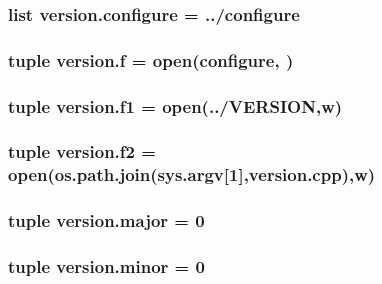 \subsubsection[{configure}]{\setlength{\rightskip}{0pt plus 5cm}list version.\+configure = \textquotesingle{}../configure\textquotesingle{}}\label{namespaceversion_aedc91fd7b4b027899ea1441123d88f96}
\hypertarget{namespaceversion_adc2f36e5bef89e3881981af504e0e31d}{}
\subsubsection[{f}]{\setlength{\rightskip}{0pt plus 5cm}tuple version.\+f = {\bf open}({\bf configure}, \textquotesingle{})}\label{namespaceversion_adc2f36e5bef89e3881981af504e0e31d}
\hypertarget{namespaceversion_ae6011bf923c4ed95d1f1de5740caa956}{}
\subsubsection[{f1}]{\setlength{\rightskip}{0pt plus 5cm}tuple version.\+f1 = {\bf open}(\textquotesingle{}../V\+E\+R\+S\+I\+O\+N\textquotesingle{},\textquotesingle{}w\textquotesingle{})}\label{namespaceversion_ae6011bf923c4ed95d1f1de5740caa956}
\hypertarget{namespaceversion_ab584c69a59e4cd6b0d5ac80b1f445303}{}
\subsubsection[{f2}]{\setlength{\rightskip}{0pt plus 5cm}tuple version.\+f2 = {\bf open}(os.\+path.\+join(sys.\+argv\mbox{[}1\mbox{]},\textquotesingle{}version.\+cpp\textquotesingle{}),\textquotesingle{}w\textquotesingle{})}\label{namespaceversion_ab584c69a59e4cd6b0d5ac80b1f445303}
\hypertarget{namespaceversion_adfa78588540698359a6bd30edafdebd0}{}
\subsubsection[{major}]{\setlength{\rightskip}{0pt plus 5cm}tuple version.\+major = 0}\label{namespaceversion_adfa78588540698359a6bd30edafdebd0}
\hypertarget{namespaceversion_a8f0f39465202c345808fc95cfb1fb95d}{}
\subsubsection[{minor}]{\setlength{\rightskip}{0pt plus 5cm}tuple version.\+minor = 0}\label{namespaceversion_a8f0f39465202c345808fc95cfb1fb95d}
\hypertarget{namespaceversion_ab493a0adfcc8c356b8ddd2c17709a770}{}
